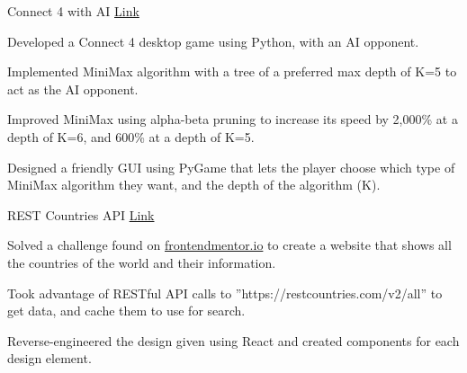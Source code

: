 

\begin{cventries}

  \cventry
    {Connect 4 with AI} %
    {} %
    {}
    {\textcolor{link}{\href{https://github.com/ad3ldev/Connect4-with-AI}{Link}}} %
    {
      \begin{cvitems} %
        \item {Developed a Connect 4 desktop game using Python, with an AI opponent.}
        \item {Implemented MiniMax algorithm with a tree of a preferred max depth of K=5 to act as the AI opponent.}
        \item {Improved MiniMax using alpha-beta pruning to increase its speed by  2,000\% at a depth of K=6, and 600\% at a depth of K=5.}
        \item {Designed a friendly GUI using PyGame that lets the player choose which type of MiniMax algorithm they want, and the depth of the algorithm (K).}
      \end{cvitems}
    }
    

  \cventry
    {REST Countries API} %
    {} %
    {}
    {\textcolor{link}{\href{https://ad3ldev.github.io/rest-countries-api}{Link}}}%
    {
      \begin{cvitems} %
        \item {Solved a challenge found on \textcolor{link}{\href{https://frontendmentor.io}{frontendmentor.io}} to create a website that shows all the countries of the world and their information.}
        \item {Took advantage of RESTful API calls to ”https://restcountries.com/v2/all” to get data, and cache them to use for search.}
        \item {Reverse-engineered the design given using React and created components for each design element.}
      \end{cvitems}
    }
    

\end{cventries}
